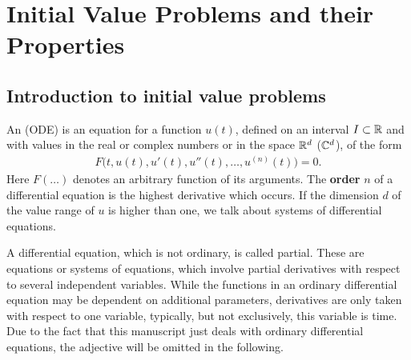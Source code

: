 \chapter{Initial Value Problems and their Properties}
\label{cha:awa}

\section{Introduction to initial value problems}


\begin{definition}
    An  (ODE) is an equation for a function $u(t)$, defined on
  an interval $I \subset \mathbb R$ and with values in the real or complex
  numbers or in the space $\mathbb R^d$ ($\mathbb C^d$), of the form
  \begin{gather}
    F\bigl(t, u(t), u'(t), u''(t), \dots, u^{(n)}(t)\bigr) = 0.
  \end{gather}
  Here $F(\ldots)$ denotes an arbitrary function of its arguments.
  The \textbf{order} $n$ of
  a differential equation is the highest derivative which occurs.  If
  the dimension $d$ of the value range of $u$ is higher than one, we
  talk about systems of differential equations.
\end{definition}

\begin{remark}
  A differential equation, which is not ordinary, is called partial.
  These are equations or systems of equations, which involve partial
  derivatives with respect to several independent variables.  While
  the functions in an ordinary differential equation may be dependent
  on additional parameters, derivatives are only taken with respect to
  one variable, typically, but not exclusively, this variable is
  time. Due to the fact that this manuscript just deals with ordinary
  differential equations, the adjective will be omitted in the
  following.
\end{remark}




